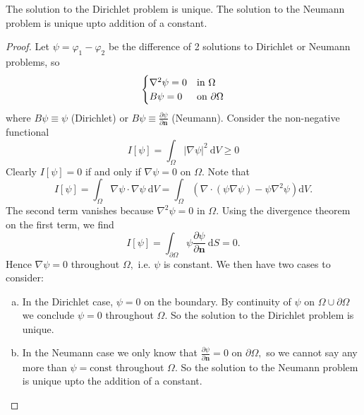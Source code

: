 \begin{proposition}
    The solution to the Dirichlet problem is unique. The solution to the Neumann problem is unique upto addition of a constant.
\end{proposition}
\begin{proof}
    Let $ \psi=\varphi_1-\varphi_2 $ be the difference of 2 solutions to Dirichlet or Neumann problems, so 
    \[
    \begin{cases}
        \laplacian \psi=0 & \text {in } \Omega \\
        B \psi=0 & \text {on } \partial \Omega
    \end{cases} 
    \]
    where $B \psi \equiv \psi$ (Dirichlet) or $B \psi \equiv \frac{\partial \psi}{\partial \mathbf{n}}$ (Neumann). Consider the non-negative functional
    \[
        I[\psi]=\int_{\Omega}|\nabla \psi|^{2} \mathrm{~d} V \ge 0
    \]
    Clearly $I[\psi]=0$ if and only if $\nabla \psi=0$ on $\Omega$. Note that
    \[
        I[\psi]=\int_{\Omega} \nabla \psi \cdot \nabla \psi \mathrm{~d} V=\int_{\Omega}\left(\nabla \cdot(\psi \nabla \psi)-\psi \nabla^{2} \psi\right) \mathrm{d} V.
    \]
    The second term vanishes because $\nabla^{2} \psi=0$ in $\Omega$. Using the divergence theorem on the first term, we find
    \[
        I[\psi]=\int_{\partial \Omega} \psi \frac{\partial \psi}{\partial \mathbf{n}} \mathrm{~d} S=0.
    \]
    Hence $\nabla \psi=0$ throughout $\Omega,$ i.e. $\psi$ is constant. We then have two cases to consider:
    \begin{enumerate}[(a)]
        \item In the Dirichlet case, $\psi=0$ on the boundary. By continuity of $\psi$ on $\Omega \cup \partial \Omega$ we conclude $\psi=0$ throughout $\Omega$. So the solution to the Dirichlet problem is unique.
        \item In the Neumann case we only know that $\frac{\partial \psi}{\partial \mathbf{n}}=0$ on $\partial \Omega,$ so we cannot say any more than $\psi=\text{const}$ throughout $\Omega$. So the solution to the Neumann problem is unique upto the addition of a constant.\qedhere
    \end{enumerate}
\end{proof}

